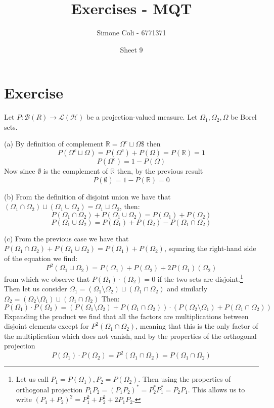 \documentclass{article}
\title{Exercises - MQT}
\author{Simone Coli - 6771371}
\date{Sheet 9}
\newcommand{\R}{\mathbb{R}}
\begin{document}
\maketitle

\section{Exercise}
Let $P: \mathcal{B} (R) \to \mathcal{L} (\mathcal{H})$ be a projection-valued measure. Let $\Omega_1, \Omega_2, \Omega$ be Borel sets. 

(a) By definition of complement $\R = \Omega^c \sqcup \Omega\$$ then
\[
    P(\Omega^c \sqcup \Omega) = P(\Omega^c) + P(\Omega) = P(\R) = 1
\]
\[
    P(\Omega^c) = 1 - P(\Omega)
\]
Now since $\emptyset$ is the complement of $\R$ then, by the previous result
\[
    P(\emptyset) = 1 - P(\R) = 0
\]

(b) From the definition of disjoint union we have that $(\Omega_1 \cap \Omega_2) \sqcup (\Omega_1 \cup \Omega_2) = \Omega_1 \sqcup \Omega_2$, then:
\[
    P(\Omega_1 \cap \Omega_2) + P(\Omega_1 \cup \Omega_2) = P(\Omega_1) + P(\Omega_2)
\]
\[
    P(\Omega_1 \cup \Omega_2) = P(\Omega_1) + P(\Omega_2) - P(\Omega_1 \cap \Omega_2)
\]

(c) From the previous case we have that $P(\Omega_1 \cap \Omega_2) + P(\Omega_1 \cup \Omega_2) = P(\Omega_1) + P(\Omega_2)$, squaring the right-hand side of the equation we find:
\[
    P^2(\Omega_1 \sqcup \Omega_2) = P(\Omega_1) + P(\Omega_2) +2P(\Omega_1)(\Omega_2) 
\]
from which we observe that $P(\Omega_1) \cdot (\Omega_2) = 0$ if the two sets are disjoint.\footnote{Let us call $P_1 = P(\Omega_1), P_2 = P(\Omega_2)$. Then using the properties of orthogonal projection $P_1 P_2 = {(P_1 P_2)}^* = P_2^* P_1^* = P_2 P_1$. This allows us to write ${(P_1 + P_2)}^2 = P_1^2 + P_2^2 + 2 P_1 P_2$.} Then let us consider $\Omega_1 = (\Omega_1 \setminus \Omega_2) \sqcup (\Omega_1 \cap \Omega_2)$ and similarly $\Omega_2 = (\Omega_2 \setminus \Omega_1) \sqcup (\Omega_1 \cap \Omega_2)$ Then:
\[
    P(\Omega_1) \cdot P(\Omega_2) = (P(\Omega_1 \setminus \Omega_2) + P(\Omega_1 \cap \Omega_2)) \cdot (P(\Omega_2 \setminus \Omega_1) + P(\Omega_1 \cap \Omega_2))
\]
Expanding the product we find that all the factors are multiplications between disjoint elements except for $P^2(\Omega_1 \cap \Omega_2)$, meaning that this is the only factor of the multiplication which does not vanish, and by the properties of the orthogonal projection
\[
    P(\Omega_1)\cdot P(\Omega_2) = P^2(\Omega_1 \cap \Omega_2) = P(\Omega_1 \cap \Omega_2)
\]
\end{document}
